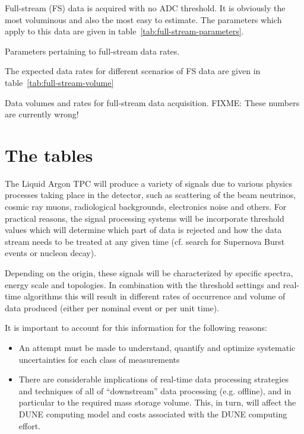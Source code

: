 Full-stream (FS) data is acquired with no ADC threshold.
It is obviously the most voluminous and also the most easy to estimate.
The parameters which apply to this data are given in table~\ref{tab:full-stream-parameters}.

\begin{table}[htbp]
  \centering
  \caption{Parameters pertaining to full-stream data rates.}
  
  \label{tab:full-stream-parameters}
\end{table}

The expected data rates for different scenarios of FS data are given
in table~\ref{tab:full-stream-volume}

\begin{table}[htbp]
  \centering
  \caption{Data volumes and rates for full-stream data
    acquisition. FIXME: These numbers are currently wrong!}
  
  \label{tab:full-stream-volume}
\end{table}


\section{The tables}

The Liquid Argon TPC will produce a variety of signals due to various
physics processes taking place in the detector, such as scattering of
the beam neutrinos, cosmic ray muons, radiological backgrounds,
electronics noise and others.
For practical reasons, the signal processing systems will be
incorporate threshold values which will determine which part of data
is rejected and how the data stream needs to be treated at any given
time (cf. search for Supernova Burst events or nucleon decay).

Depending on the origin, these signals will be characterized by
specific spectra, energy scale and topologies.
In combination with the threshold settings and real-time algorithms
this will result in different rates of occurrence and volume of data
produced (either per nominal event or per unit time).

It is important to account for this information for the following reasons:
\begin{itemize}
\item An attempt must be made to understand, quantify and optimize
  systematic uncertainties for each class of measurements
\item There are considerable implications of real-time data processing
  strategies and techniques of all of ``downstream'' data processing
  (e.g. offline), and in particular to the required mass storage
  volume.
  This, in turn, will affect the DUNE computing model and costs
  associated with the DUNE computing effort.
\end{itemize}


